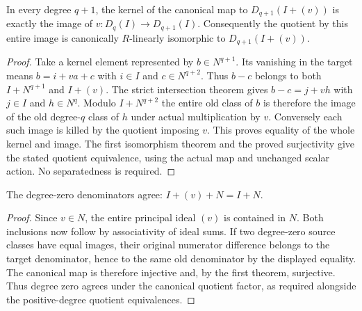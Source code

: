 \begin{theorem}
\label{hir:strict-parameter-whole-layer-kernel}
\leanok
In every degree $q+1$, the kernel of the canonical map to
$D_{q+1}(I+(v))$ is exactly the image of
$v:D_q(I)\to D_{q+1}(I)$. Consequently the quotient by this entire image
is canonically $R$-linearly isomorphic to $D_{q+1}(I+(v))$.
\end{theorem}
\begin{proof}
Take a kernel element represented by $b\in N^{q+1}$. Its vanishing in
the target means $b=i+va+c$ with $i\in I$ and $c\in N^{q+2}$.
Thus $b-c$ belongs to both $I+N^{q+1}$ and $I+(v)$. The strict
intersection theorem gives $b-c=j+vh$ with $j\in I$ and $h\in N^q$.
Modulo $I+N^{q+2}$ the entire old class of $b$ is therefore the image
of the old degree-$q$ class of $h$ under actual multiplication by $v$.
Conversely each such image is killed by the quotient imposing $v$.
This proves equality of the whole kernel and image. The first
isomorphism theorem and the proved surjectivity give the stated
quotient equivalence, using the actual map and unchanged scalar action.
No separatedness is required.
\end{proof}

\begin{theorem}
\label{hir:strict-parameter-degree-zero}
\leanok
The degree-zero denominators agree: $I+(v)+N=I+N$.
\end{theorem}
\begin{proof}
Since $v\in N$, the entire principal ideal $(v)$ is contained in $N$.
Both inclusions now follow by associativity of ideal sums. If two degree-zero source classes have equal images, their original
numerator difference belongs to the target denominator, hence to the
same old denominator by the displayed equality. The canonical map is
therefore injective and, by the first theorem, surjective. Thus degree
zero agrees under the canonical quotient factor, as required alongside
the positive-degree quotient equivalences.
\end{proof}
